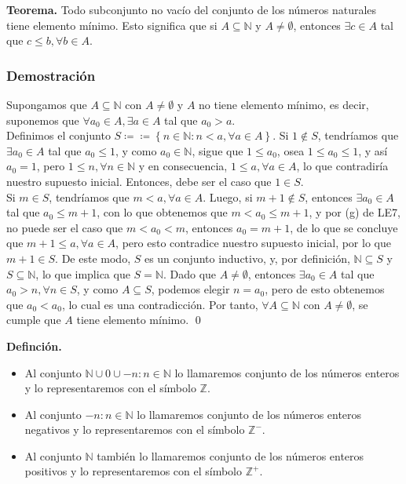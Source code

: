 \documentclass[11pt]{article}
\newcommand{\N}{\mathbb{N}}
\newcommand{\Z}{\mathbb{Z}}
\def\defined #1{\coloneqq \left\{#1\right\}}
\begin{document}
\textbf{Teorema.} Todo subconjunto no vacío del conjunto de los números naturales tiene elemento mínimo. Esto significa que si $A\subseteq \N$ y $A \neq \emptyset$, entonces $\exists c\in A$ tal que $c\leq b, \forall b\in A$.

\subsubsection*{Demostración}

Supongamos que $A\subseteq \N$ con $A\neq \emptyset$ y $A$ no tiene elemento mínimo, es decir, suponemos que $\forall a_0\in A, \exists a\in A$ tal que $a_0>a$.\\[5pt]Definimos el conjunto $S \coloneqq \defined{n\in \N: n<a, \forall a \in A}$. Si $1\notin S$, tendríamos que $\exists a_0\in A$ tal que $a_0\leq 1$, y como $a_0\in \N$, sigue que $1 \leq a_0$, osea $1\leq a_0\leq 1$, y así $a_0 = 1$, pero $1\leq n, \forall n\in \N$ y en consecuencia, $1\leq a, \forall a\in A$, lo que contradiría nuestro supuesto inicial. Entonces, debe ser el caso que $1\in S$.\\[5pt] Si $m\in S$, tendríamos que $m<a, \forall a\in A$. Luego, si $m+1\notin S$, entonces $\exists a_0\in A$ tal que $a_0 \leq m+1$, con lo que obtenemos que $m<a_0 \leq m+1$, y por (g) de LE7, no puede ser el caso que $m<a_0<m$, entonces $a_0=m+1$, de lo que se concluye que $m+1\leq a , \forall a \in A$, pero esto contradice nuestro supuesto inicial, por lo que $m+1\in S$. De este modo, $S$ es un conjunto inductivo, y, por definición, $\N\subseteq S$ y  $S\subseteq \N$, lo que implica que $S=\N$. Dado que $A\neq \emptyset$, entonces $\exists a_0\in A$ tal que $a_0 >n, \forall n\in S$, y como $A\subseteq S$, podemos elegir $n=a_0$, pero de esto obtenemos que $a_0<a_0$, lo cual es una contradicción. Por tanto, $\forall A\subseteq \N$ con $A\neq \emptyset$, se cumple que $A$ tiene elemento mínimo. \qed

\textbf{Definción.} \begin{itemize}
    \item Al conjunto $\N \cup {0} \cup {-n: n\in \N}$ lo llamaremos conjunto de los números enteros y lo representaremos con el símbolo $\Z$.
    \item Al conjunto ${-n: n\in \N}$ lo llamaremos conjunto de los números enteros negativos y lo representaremos con el símbolo $\Z^-$.
    \item Al conjunto $\N$ también lo llamaremos conjunto de los números enteros positivos y lo representaremos con el símbolo $\Z^+$.
\end{itemize}
\end{document}
